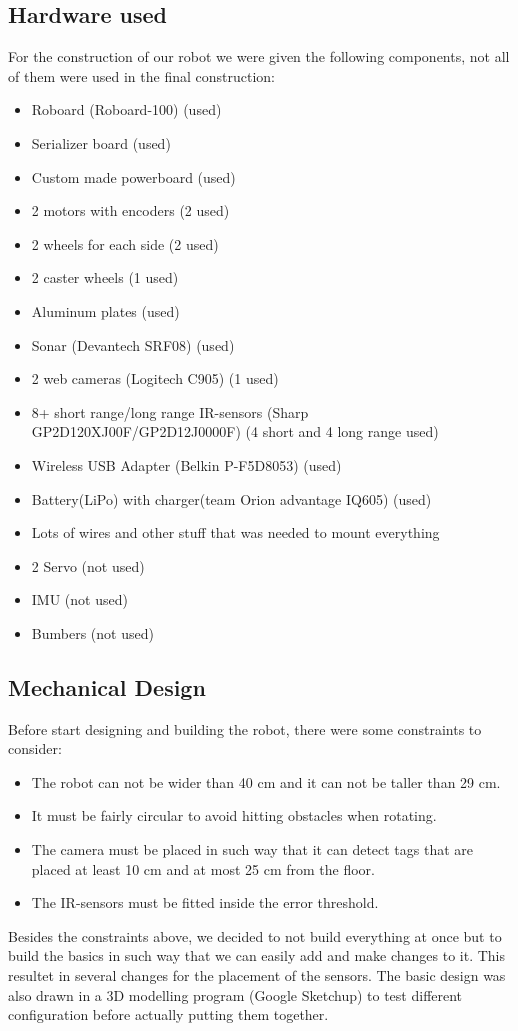 \subsection{Hardware used}

For the construction of our robot we were given the following components, not all of them were used in the final construction:
\begin{itemize}
\item Roboard (Roboard-100) (used)
\item Serializer board (used)
\item Custom made powerboard (used)
\item 2 motors with encoders (2 used)
\item 2 wheels for each side (2 used)
\item 2 caster wheels (1 used)
\item Aluminum plates (used)
\item Sonar (Devantech SRF08) (used)
\item 2 web cameras (Logitech C905) (1 used)
\item 8+ short range/long range IR-sensors (Sharp GP2D120XJ00F/GP2D12J0000F) (4 short and 4 long range used)
\item Wireless USB Adapter (Belkin P-F5D8053) (used)
\item Battery(LiPo) with charger(team Orion advantage IQ605) (used)
\item Lots of wires and other stuff that was needed to mount everything
\item 2 Servo (not used)
\item IMU (not used)
\item Bumbers (not used)
\end{itemize}


\subsection{Mechanical Design}

Before start designing and building the robot, there were some constraints to consider:
\begin{itemize}
\item The robot can not be wider than 40 cm and it can not be taller than 29 cm.
\item It must be fairly circular to avoid hitting obstacles when rotating.
\item The camera must be placed in such way that it can detect tags that are placed at least 10 cm and at most 25 cm from the floor.
\item The IR-sensors must be fitted inside the error threshold.
\end{itemize}
Besides the constraints above, we decided to not build everything at once but to build the basics in such way that we can easily add and make changes to it. This resultet in several changes for the placement of the sensors.
The basic design was also drawn in a 3D modelling program (Google Sketchup) to test different configuration before actually putting them together.


